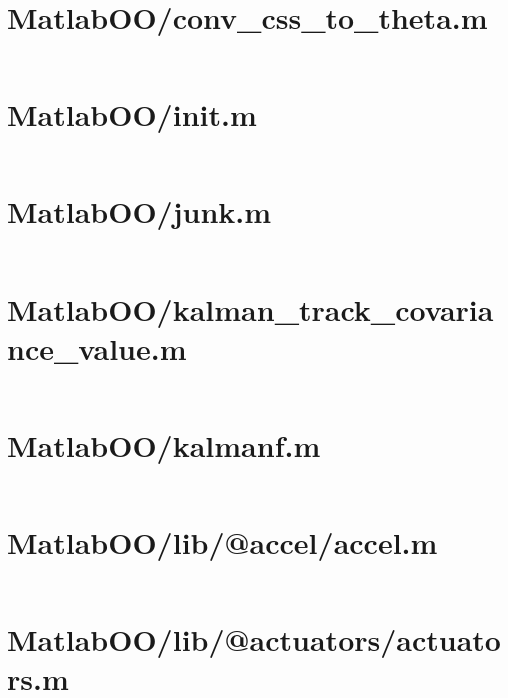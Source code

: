 \pagebreak
\section{MatlabOO/conv\_css\_to\_theta.m}\label{code:MatlabOO/conv_css_to_theta.m}
\inputminted[linenos,fontsize=\scriptsize]{matlab}{/home/dcouture/git/mathyourlife/TSatPy/beta_versions/matlab_object_oriented/conv_css_to_theta.m}

\pagebreak
\section{MatlabOO/init.m}\label{code:MatlabOO/init.m}
\inputminted[linenos,fontsize=\scriptsize]{matlab}{/home/dcouture/git/mathyourlife/TSatPy/beta_versions/matlab_object_oriented/init.m}

\pagebreak
\section{MatlabOO/junk.m}\label{code:MatlabOO/junk.m}
\inputminted[linenos,fontsize=\scriptsize]{matlab}{/home/dcouture/git/mathyourlife/TSatPy/beta_versions/matlab_object_oriented/junk.m}

\pagebreak
\section{MatlabOO/kalman\_track\_covariance\_value.m}\label{code:MatlabOO/kalman_track_covariance_value.m}
\inputminted[linenos,fontsize=\scriptsize]{matlab}{/home/dcouture/git/mathyourlife/TSatPy/beta_versions/matlab_object_oriented/kalman_track_covariance_value.m}

\pagebreak
\section{MatlabOO/kalmanf.m}\label{code:MatlabOO/kalmanf.m}
\inputminted[linenos,fontsize=\scriptsize]{matlab}{/home/dcouture/git/mathyourlife/TSatPy/beta_versions/matlab_object_oriented/kalmanf.m}

\pagebreak
\section{MatlabOO/lib/@accel/accel.m}\label{code:MatlabOO/lib/@accel/accel.m}
\inputminted[linenos,fontsize=\scriptsize]{matlab}{/home/dcouture/git/mathyourlife/TSatPy/beta_versions/matlab_object_oriented/lib/@accel/accel.m}

\pagebreak
\section{MatlabOO/lib/@actuators/actuators.m}\label{code:MatlabOO/lib/@actuators/actuators.m}
\inputminted[linenos,fontsize=\scriptsize]{matlab}{/home/dcouture/git/mathyourlife/TSatPy/beta_versions/matlab_object_oriented/lib/@actuators/actuators.m}

